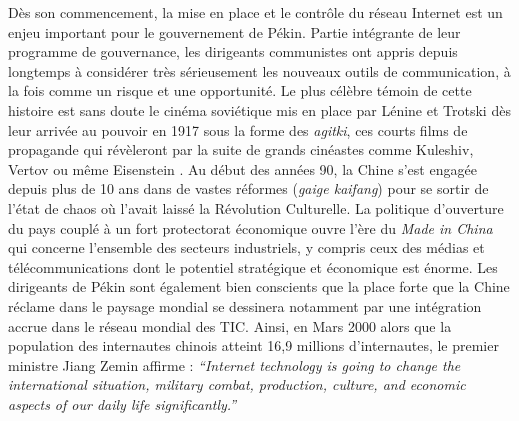Dès son commencement, la mise en place et le contrôle du réseau Internet est un enjeu important pour le gouvernement de Pékin. Partie intégrante de leur programme de gouvernance, les dirigeants communistes ont appris depuis longtemps à considérer très sérieusement les nouveaux outils de communication, à la fois comme un risque et une opportunité. Le plus célèbre témoin de cette histoire est sans doute le cinéma soviétique mis en place par Lénine et Trotski dès leur arrivée au pouvoir en 1917 sous la forme des \textit{agitki}, ces courts films de propagande qui révèleront par la suite de grands cinéastes comme Kuleshiv, Vertov ou même Eisenstein \citep{Mazuy2002}. Au début des années 90, la Chine s’est engagée depuis plus de 10 ans dans de vastes réformes (\textit{gaige kaifang}) pour se sortir de l’état de chaos où l’avait laissé la Révolution Culturelle. La politique d’ouverture du pays couplé à un fort protectorat économique ouvre l’ère du \textit{Made in China} qui concerne l’ensemble des secteurs industriels, y compris ceux des médias et télécommunications dont le potentiel stratégique et économique est énorme. Les dirigeants de Pékin sont également bien conscients que la place forte que la Chine réclame dans le paysage mondial se dessinera notamment par une intégration accrue dans le réseau mondial des TIC. Ainsi, en Mars 2000 alors que la population des internautes chinois atteint 16,9 millions d’internautes, le premier ministre Jiang Zemin affirme : \textit{“Internet technology is going to change the international situation, military combat, production, culture, and economic aspects of our daily life significantly.”} \citep{Foster2000}

